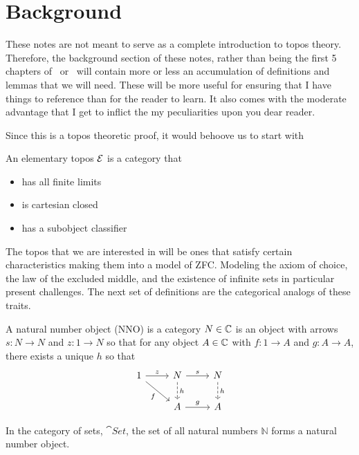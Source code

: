 \section{Background}\label{sec:background}

These notes are not meant to serve as a complete introduction to topos
theory. Therefore, the background section of these notes, rather than
being the first 5 chapters of~\citet{MacLane:92}
or~\citet{Johnstone:14} will contain more or less an accumulation of
definitions and lemmas that we will need. These will be more useful
for ensuring that I have things to reference than for the reader to
learn. It also comes with the moderate advantage that I get to inflict
the my peculiarities upon you dear reader.

Since this is a topos theoretic proof, it would behoove us to start
with
\begin{defn}\label{defn:background:topos}
  An elementary topos $\mathcal{E}{}$ is a category that
  \begin{itemize}
  \item has all finite limits
  \item is cartesian closed
  \item has a subobject classifier
  \end{itemize}
\end{defn}
The topos that we are interested in will be ones that satisfy certain
characteristics making them into a model of ZFC. Modeling the axiom of
choice, the law of the excluded middle, and the existence of infinite
sets in particular present challenges. The next set of definitions are
the categorical analogs of these traits.
\begin{defn}\label{defn:background:nno}
  A natural number object (NNO) is a category $N \in \mathbb{C}$ is an object
  with arrows $s : N \to N$ and $z : 1 \to N$ so that for any object
  $A \in \mathbb{C}$ with $f : 1 \to A$ and $g : A \to A$, there exists a
  unique $h$ so that
  \[
    \begin{tikzcd}
      1 \ar[r, "z"] \ar[dr, swap, "f"] & N \ar[d, dashed, "h"] \ar[r, "s"]& N \ar[d, dashed, "h"]\\
      & A \ar[r, "g"]& A
    \end{tikzcd}
  \]
\end{defn}

\begin{example}
  In the category of sets, $\cat{Set}$, the set of all natural numbers
  $\mathbb{N}$ forms a natural number object.
\end{example}

